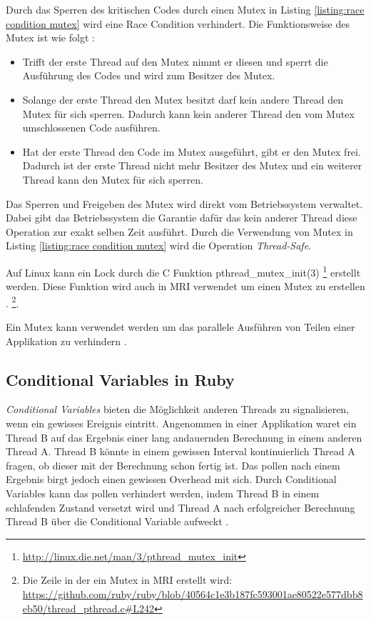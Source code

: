 Durch das Sperren des kritischen Codes durch einen Mutex in Listing \ref{listing:race condition mutex} wird eine Race Condition verhindert. Die Funktionsweise des Mutex ist wie folgt \cite[p. 83-84]{Sto2013}: 

\begin{itemize}
  \item Trifft der erste Thread auf den Mutex nimmt er diesen und sperrt die Ausführung des Codes und wird zum Besitzer des Mutex.
  \item Solange der erste Thread den Mutex besitzt darf kein andere Thread den Mutex für sich sperren. Dadurch kann kein anderer Thread den vom Mutex umschlossenen Code ausführen. 
  \item Hat der erste Thread den Code im Mutex ausgeführt, gibt er den Mutex frei. Dadurch ist der erste Thread nicht mehr Besitzer des Mutex und ein weiterer Thread kann den Mutex für sich sperren.
\end{itemize}

Das Sperren und Freigeben des Mutex wird direkt vom Betriebssystem verwaltet. Dabei gibt das Betriebssystem die Garantie dafür das kein anderer Thread diese Operation zur exakt selben Zeit ausführt. Durch die Verwendung von Mutex in Listing \ref{listing:race condition mutex} wird die Operation \emph{Thread-Safe}.

Auf Linux kann ein Lock durch die C Funktion pthread\_mutex\_init(3) \footnote{\url{http://linux.die.net/man/3/pthread_mutex_init}} erstellt werden. Diese Funktion wird auch in MRI verwendet um einen Mutex zu erstellen \cite[p. 83-84]{Sto2013}. \footnote{Die Zeile in der ein Mutex in MRI erstellt wird: \url{https://github.com/ruby/ruby/blob/40564c1e3b187fc593001ae80522e577dbb8eb50/thread_pthread.c#L242}}.

Ein Mutex kann verwendet werden um das parallele Ausführen von Teilen einer Applikation zu verhindern \cite[p. 91]{Sto2013}.

\subsection{Conditional Variables in Ruby}

\emph{Conditional Variables} bieten die Möglichkeit anderen Threads zu signalisieren, wenn ein gewisses Ereignis eintritt. Angenommen in einer Applikation waret ein Thread B auf das Ergebnis einer lang andauernden Berechnung in einem anderen Thread A. Thread B könnte in einem gewissen Interval kontinuierlich Thread A fragen, ob dieser mit der Berechnung schon fertig ist. Das pollen nach einem Ergebnis birgt jedoch einen gewissen Overhead mit sich. Durch Conditional Variables kann das pollen verhindert werden, indem Thread B in einem schlafenden Zustand versetzt wird und Thread A nach erfolgreicher Berechnung Thread B über die Conditional Variable aufweckt \cite[p. 748]{tan09} \cite[p. 100]{Sto2013}. 

